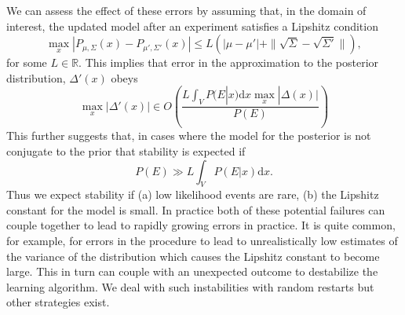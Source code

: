 \documentclass[twoside]{article}
\newtheorem{lemma}{Lemma}
\begin{document}
We can assess the effect of these errors by assuming that, in the domain of interest, the updated model after an experiment satisfies a Lipshitz condition
\begin{equation}
\max_x|P_{\mu,\Sigma}(x) - P_{\mu' ,\Sigma'}(x)| \le L(|\mu- \mu'| +\|\sqrt{\Sigma}- \sqrt{\Sigma'}\|),
\end{equation}
for some $L\in \mathbb{R}$.  This implies that error in the approximation to the posterior distribution, $\Delta'(x)$ obeys
\begin{equation}
\max_x |\Delta'(x)| \in O\left( \frac{L\int_V P(E|x) \mathrm{d}x \max_x |\Delta(x)|}{P(E)}\right)
\end{equation}
This further suggests that, in cases where the model for the posterior is not conjugate to the prior that stability is expected if
\begin{equation}
P(E) \gg {L\int_V P(E|x) \mathrm{d}x }.
\end{equation}
Thus we expect stability if (a) low likelihood events are rare, (b) the Lipshitz constant for the model is small.  In practice both of these potential failures can couple together to lead to rapidly growing errors in practice.  It is quite common, for example, for errors in the procedure to lead to unrealistically low estimates of the variance of the distribution which causes the Lipshitz constant to become large.  This in turn can couple with an unexpected outcome to destabilize the learning algorithm.  We deal with such instabilities with random restarts but other strategies exist.

%
%
\end{document}
